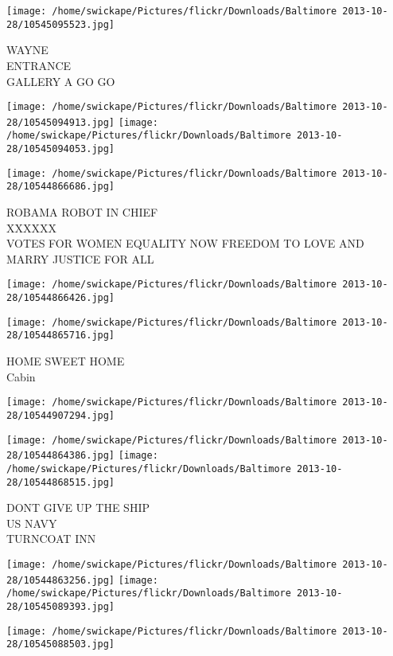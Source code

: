 \documentclass[10pt,letterpaper]{article}
\begin{document}
\vspace{0.25in}
\texttt{[image: /home/swickape/Pictures/flickr/Downloads/Baltimore 2013-10-28/10545095523.jpg]}

WAYNE\\
ENTRANCE\\
GALLERY A GO GO
\pagebreak

\texttt{[image: /home/swickape/Pictures/flickr/Downloads/Baltimore 2013-10-28/10545094913.jpg]}
\texttt{[image: /home/swickape/Pictures/flickr/Downloads/Baltimore 2013-10-28/10545094053.jpg]}

\vspace{0.25in}
\texttt{[image: /home/swickape/Pictures/flickr/Downloads/Baltimore 2013-10-28/10544866686.jpg]}

ROBAMA ROBOT IN CHIEF\\
XXXXXX\\
VOTES FOR WOMEN EQUALITY NOW FREEDOM TO LOVE AND MARRY JUSTICE FOR ALL
\pagebreak

\texttt{[image: /home/swickape/Pictures/flickr/Downloads/Baltimore 2013-10-28/10544866426.jpg]}

\vspace{0.25in}
\texttt{[image: /home/swickape/Pictures/flickr/Downloads/Baltimore 2013-10-28/10544865716.jpg]}

HOME SWEET HOME\\
Cabin
\pagebreak

\texttt{[image: /home/swickape/Pictures/flickr/Downloads/Baltimore 2013-10-28/10544907294.jpg]}

\vspace{0.25in}
\texttt{[image: /home/swickape/Pictures/flickr/Downloads/Baltimore 2013-10-28/10544864386.jpg]}
\texttt{[image: /home/swickape/Pictures/flickr/Downloads/Baltimore 2013-10-28/10544868515.jpg]}

DONT GIVE UP THE SHIP\\
US NAVY\\
TURNCOAT INN
\pagebreak

\texttt{[image: /home/swickape/Pictures/flickr/Downloads/Baltimore 2013-10-28/10544863256.jpg]}
\texttt{[image: /home/swickape/Pictures/flickr/Downloads/Baltimore 2013-10-28/10545089393.jpg]}

\texttt{[image: /home/swickape/Pictures/flickr/Downloads/Baltimore 2013-10-28/10545088503.jpg]}
\end{document}
